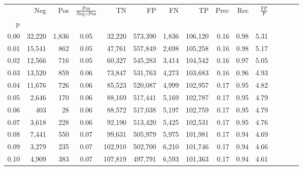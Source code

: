 \begin{tabular}{rrrcrrrrrrrrrrr}
\toprule
{} &     Neg &    Pos & $\frac{\text{Pos}}{\text{Neg}+\text{Pos}}$ &       TN &       FP &       FN &       TP &  Prec &   Rec & $\frac{\text{FP}}{\text{P}}$ \\
p    &         &        &                                            &          &          &          &          &       &       &                              \\
\midrule
0.00 &  32,220 &  1,836 &                                       0.05 &   32,220 &  573,390 &    1,836 &  106,120 &  0.16 &  0.98 &                         5.31 \\
0.01 &  15,541 &    862 &                                       0.05 &   47,761 &  557,849 &    2,698 &  105,258 &  0.16 &  0.98 &                         5.17 \\
0.02 &  12,566 &    716 &                                       0.05 &   60,327 &  545,283 &    3,414 &  104,542 &  0.16 &  0.97 &                         5.05 \\
0.03 &  13,520 &    859 &                                       0.06 &   73,847 &  531,763 &    4,273 &  103,683 &  0.16 &  0.96 &                         4.93 \\
0.04 &  11,676 &    726 &                                       0.06 &   85,523 &  520,087 &    4,999 &  102,957 &  0.17 &  0.95 &                         4.82 \\
0.05 &   2,646 &    170 &                                       0.06 &   88,169 &  517,441 &    5,169 &  102,787 &  0.17 &  0.95 &                         4.79 \\
0.06 &     403 &     28 &                                       0.06 &   88,572 &  517,038 &    5,197 &  102,759 &  0.17 &  0.95 &                         4.79 \\
0.07 &   3,618 &    228 &                                       0.06 &   92,190 &  513,420 &    5,425 &  102,531 &  0.17 &  0.95 &                         4.76 \\
0.08 &   7,441 &    550 &                                       0.07 &   99,631 &  505,979 &    5,975 &  101,981 &  0.17 &  0.94 &                         4.69 \\
0.09 &   3,279 &    235 &                                       0.07 &  102,910 &  502,700 &    6,210 &  101,746 &  0.17 &  0.94 &                         4.66 \\
0.10 &   4,909 &    383 &                                       0.07 &  107,819 &  497,791 &    6,593 &  101,363 &  0.17 &  0.94 &                         4.61 \\

\end{tabular}
